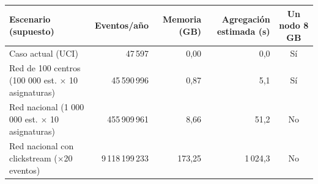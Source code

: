 \begin{tabular}{p{6.2cm}rrrc}
\toprule
Escenario (supuesto) & Eventos/año & Memoria (GB) & Agregación estimada (s) & Un nodo 8 GB \\
\midrule
Caso actual (UCI) & 47\,597 & 0,00 & 0,0 & Sí \\
Red de 100 centros (100 000 est. $\times$ 10 asignaturas) & 45\,590\,996 & 0,87 & 5,1 & Sí \\
Red nacional (1 000 000 est. $\times$ 10 asignaturas) & 455\,909\,961 & 8,66 & 51,2 & No \\
Red nacional con clickstream ($\times$20 eventos) & 9\,118\,199\,233 & 173,25 & 1\,024,3 & No \\
\bottomrule
\end{tabular}
